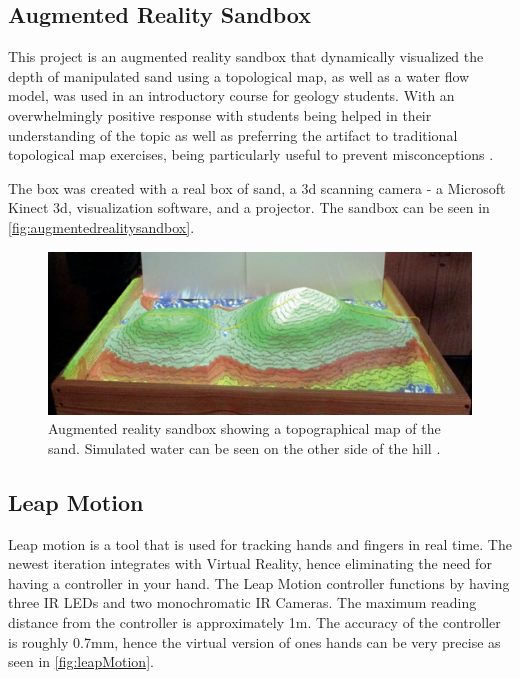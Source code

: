 	\subsection{Augmented Reality Sandbox} %
	    This project is an augmented reality sandbox that dynamically visualized the depth of manipulated sand using a topological map, as well as a water flow model, was used in an introductory course for geology students. With an overwhelmingly positive response with students being helped in their understanding of the topic as well as preferring the artifact to traditional topological map exercises, being particularly useful to prevent misconceptions \cite{woods2016pilot}.

	    The box was created with a real box of sand, a 3d scanning camera - a Microsoft Kinect 3d,  visualization software, and a projector.  The sandbox can be seen in \autoref{fig:augmentedrealitysandbox}.
	
	\begin{figure}[H]
		\centering
		\includegraphics[width=0.9\linewidth]{figure/Analysis/augmentedrealitysandbox.png}
		\caption{Augmented reality sandbox showing a topographical map of the sand. Simulated water can be seen on the other side of the hill \cite{woods2016pilot}.}
		\label{fig:augmentedrealitysandbox}
	\end{figure}



\subsection{Leap Motion} %
    Leap motion is a tool that is used for tracking hands and fingers in real time\cite{leapMotion}. The newest iteration integrates with Virtual Reality, hence eliminating the need for having a controller in your hand. The Leap Motion controller functions by having three IR LEDs and two monochromatic IR Cameras. The maximum reading distance from the controller is approximately 1m\cite{leapMotion}. The accuracy of the controller is roughly 0.7mm, hence the virtual version of ones hands can be very precise as seen in \autoref{fig:leapMotion}.
    
